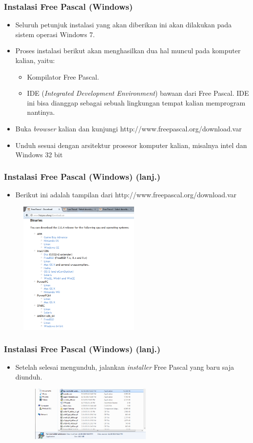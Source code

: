 \documentclass{beamer}
\begin{document}
\begin{frame}
\frametitle{Instalasi Free Pascal (Windows)}
\begin{itemize}
	\item Seluruh petunjuk instalasi yang akan diberikan ini akan dilakukan pada sistem operasi Windows 7.
	\item Proses instalasi berikut akan menghasilkan dua hal muncul pada komputer kalian, yaitu:
	\begin{itemize}
		\item Kompilator Free Pascal.
		\item IDE (\textit{Integrated Development Environment}) bawaan dari Free Pascal. IDE ini bisa dianggap sebagai sebuah lingkungan tempat kalian memprogram nantinya.
	\end{itemize}
	\item Buka \textit{browser} kalian dan kunjungi http://www.freepascal.org/download.var
	\item Unduh sesuai dengan arsitektur prosesor komputer kalian, misalnya intel dan Windows 32 bit
\end{itemize}
\end{frame}

\begin{frame}
\frametitle{Instalasi Free Pascal (Windows) (lanj.)}
\begin{itemize}
	\item Berikut ini adalah tampilan dari http://www.freepascal.org/download.var
\end{itemize}
\begin{figure}
	\includegraphics[width=6cm]{asset/dl_list1.PNG}
\end{figure}
\end{frame}

\begin{frame}
\frametitle{Instalasi Free Pascal (Windows) (lanj.)}
\begin{itemize}
	\item Setelah selesai mengunduh, jalankan \textit{installer} Free Pascal yang baru saja diunduh.
	\begin{figure}
		\includegraphics[width=6cm]{asset/fpc_1.PNG}
	\end{figure}
\end{itemize}
\end{frame}
\end{document}
